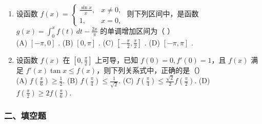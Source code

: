 \documentclass[12pt, a4paper]{ctexart}
\begin{document}
\begin{enumerate}
    \item 设函数 $ f(x) = \begin{cases} \frac{\sin x}{x}, & x \neq 0, \\ 1, & x = 0, \end{cases} $ 则下列区间中，是函数 $ g(x) = \int_0^x f(t) \, dt - \frac{2x}{\pi} $ 的单调增加区间为（ ）\\
    (A) $ [- \pi, 0] $ . (B) $ [0, \pi] $ . (C) $ \left[-\frac{\pi}{2}, \frac{\pi}{2}\right] $ . (D) $ [- \pi, \pi] $ .

    \item 设函数 $ f(x) $ 在 $ \left[0, \frac{\pi}{2}\right] $ 上可导，已知 $ f(0) = 0, f'(0) = 1 $，且 $ f(x) $ 满足 $ f'(x) \tan x \leq f(x) $，则下列关系式中，正确的是（）\\
    (A) $ f\left(\frac{\pi}{6}\right) \geq \frac{1}{2} $. \quad (B) $ f\left(\frac{\pi}{4}\right) \leq \frac{1}{\sqrt{2}} $. \quad (C) $ f\left(\frac{\pi}{4}\right) \leq \frac{\sqrt{2}}{2} f\left(\frac{\pi}{2}\right) $. \quad (D) $ f\left(\frac{\pi}{2}\right) \geq 2f\left(\frac{\pi}{6}\right) $.
\end{enumerate}

\subsubsection*{二、填空题}
\end{document}
